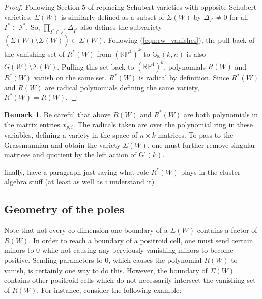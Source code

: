 \documentclass[11pt]{article}
\newcommand{\R}{\mathbb{R}}
\newcommand{\Grall}{\mathbb{G}_{\R}}
\newtheorem{thm}{Theorem}[section]
\theoremstyle{remark}
\theoremstyle{definition}
\newtheorem{rmk}[thm]{Remark}
\begin{document}
\begin{proof}
Following Section 5 of \cite{knutsonlamspeyerjuggling} replacing Schubert varieties with opposite Schubert varieties, $\Sigma(W)$ is similarly defined as a subset of $\overline{\Sigma(W)}$ by $\Delta_{I^{\ast}} \neq 0$ for all $I^{\ast} \in \mathcal{I}^{\ast}$. So, $\prod_{I^{\ast} \in \mathcal{I}^{\ast}} \Delta_{I^{\ast}}$ also defines the subvariety $(\overline{\Sigma(W)} \setminus \Sigma(W)) \subset \overline{\Sigma(W)}$. Following (\ref{eqn:rw_vanishes}), the pull back of the vanishing set of $R^{\ast}(W)$ from $(\mathbb{RP}^4)^{k}$ to $\Grall(k,n)$ is also $G(W) \setminus \Sigma(W)$. Pulling this set back to $(\mathbb{RP}^4)^{k}$, polynomials $R(W)$ and $R^{\ast}(W)$ vanish on the same set. $R^{\ast}(W)$ is radical by definition. Since $R^{\ast}(W)$ and $R(W)$ are radical polynomials defining the same variety, $R^{\ast}(W) = R(W)$.
\end{proof}


\begin{rmk}
Be careful that above $R(W)$ and $R^{\ast}(W)$ are both polynomials in the matrix entries $x_{p,i}$. The radicals taken are over the polynomial ring in these variables, defining a variety in the space of $n \times k$ matrices. To pass to the Grassmannian and obtain the variety $\overline{\Sigma(W)}$, one must further remove singular matrices and quotient by the left action of $\mathrm{Gl}(k)$. 
\end{rmk}

{\color{red} finally, have a paragraph just saying what role $R^{\ast}(W)$ plays in the cluster algebra stuff (at least as well as i understand it)}


\subsection{Geometry of the poles}

Note that not every co-dimension one boundary of a $\Sigma(W)$ contains a factor of $R(W)$. In order to reach a boundary of a positroid cell, one must send certain minors to 0 while not causing any perviously vanishing minors to become positive. Sending parameters to $0$, which causes the polynomial $R(W)$ to vanish, is certainly one way to do this. However, the boundary of $\Sigma(W)$ contains other positroid cells which do not necessarily intersect the vanishing set of $R(W)$. For instance, consider the following example:
\end{document}
